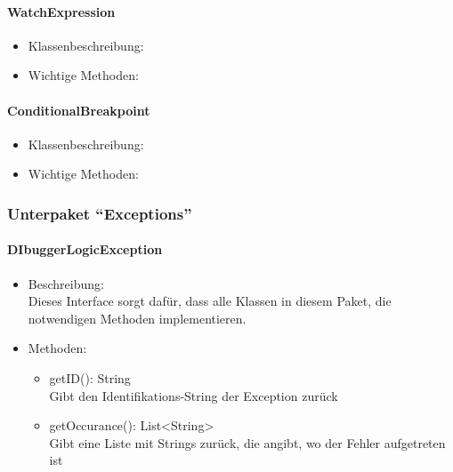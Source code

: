 \documentclass[parskip=full]{scrartcl}
\begin{document}
\paragraph{WatchExpression}
\begin{itemize}
\item Klassenbeschreibung: \\

\item Wichtige Methoden:\\


\end{itemize}
\paragraph{ConditionalBreakpoint}
\begin{itemize}
\item Klassenbeschreibung: \\

\item Wichtige Methoden:\\


\end{itemize}


\subsubsection{Unterpaket \enquote{Exceptions}}

\paragraph{DIbuggerLogicException}
\begin{itemize}
\item Beschreibung: \\
Dieses Interface sorgt dafür, dass alle Klassen in diesem Paket, die notwendigen Methoden implementieren.
\item Methoden: \\
\begin{itemize}
\item getID(): String \\
Gibt den Identifikations-String der Exception zurück
\item getOccurance(): List<String> \\
Gibt eine Liste mit Strings zurück, die angibt, wo der Fehler aufgetreten ist
\end{itemize}
\end{itemize}
\end{document}
